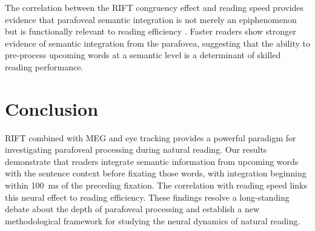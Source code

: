 \documentclass[12pt]{article}
\begin{document}
The correlation between the RIFT congruency effect and reading speed provides evidence that parafoveal semantic integration is not merely an epiphenomenon but is functionally relevant to reading efficiency \citep{rayner1998eye}. Faster readers show stronger evidence of semantic integration from the parafovea, suggesting that the ability to pre-process upcoming words at a semantic level is a determinant of skilled reading performance.

\section{Conclusion}

RIFT combined with MEG and eye tracking provides a powerful paradigm for investigating parafoveal processing during natural reading. Our results demonstrate that readers integrate semantic information from upcoming words with the sentence context before fixating those words, with integration beginning within 100~ms of the preceding fixation. The correlation with reading speed links this neural effect to reading efficiency. These findings resolve a long-standing debate about the depth of parafoveal processing and establish a new methodological framework for studying the neural dynamics of natural reading.



\end{document}
